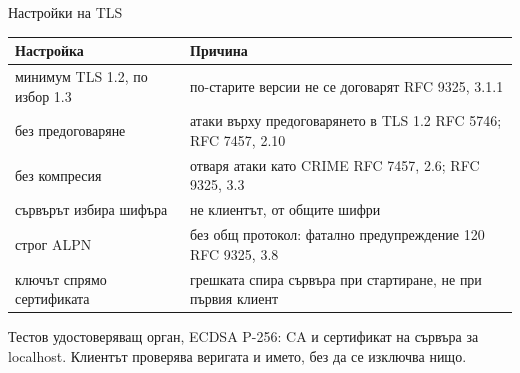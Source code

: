 \documentclass[aspectratio=169, 11pt]{beamer}
\newcommand{\code}[1]{{\ttfamily #1}}
\newcommand{\src}[1]{{\color{muted}\scriptsize #1}}
\begin{document}
\begin{frame}{Настройки на TLS}
\small
\renewcommand{\arraystretch}{1.15}
\begin{tabular}{@{}p{}p{}@{}}
\toprule
\textbf{Настройка} & \textbf{Причина} \\
\midrule
минимум TLS 1.2, по избор 1.3 & по-старите версии не се договарят \src{RFC 9325, 3.1.1} \\
без предоговаряне & атаки върху предоговарянето в TLS 1.2 \src{RFC 5746; RFC 7457, 2.10} \\
без компресия & отваря атаки като CRIME \src{RFC 7457, 2.6; RFC 9325, 3.3} \\
сървърът избира шифъра & не клиентът, от общите шифри \\
строг ALPN & без общ протокол: фатално предупреждение 120 \src{RFC 9325, 3.8} \\
ключът спрямо сертификата & грешката спира сървъра при стартиране, не при първия клиент \\
\bottomrule
\end{tabular}\par\medskip
{\small Тестов удостоверяващ орган, ECDSA P-256: CA и сертификат на сървъра за \code{localhost}.
Клиентът проверява веригата и името, без да се изключва нищо.\par}
\end{frame}
\end{document}
